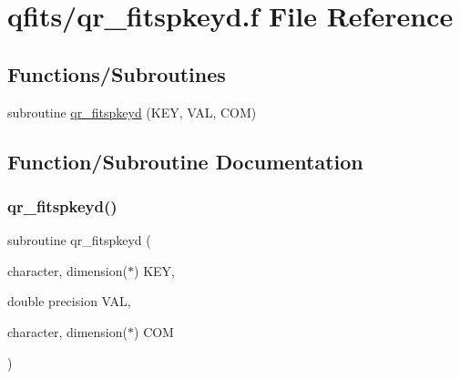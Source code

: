 \hypertarget{qr__fitspkeyd_8f}{}\section{qfits/qr\+\_\+fitspkeyd.f File Reference}
\label{qr__fitspkeyd_8f}
\subsection*{Functions/\+Subroutines}
\begin{DoxyCompactItemize}
\item 
subroutine \hyperlink{qr__fitspkeyd_8f_ac523cda00503719a0268a4125191151a}{qr\+\_\+fitspkeyd} (K\+EY, V\+AL, C\+OM)
\end{DoxyCompactItemize}


\subsection{Function/\+Subroutine Documentation}
\mbox{\label{qr__fitspkeyd_8f_ac523cda00503719a0268a4125191151a}} 
\subsubsection{\texorpdfstring{qr\+\_\+fitspkeyd()}{qr\_fitspkeyd()}}
{\footnotesize\ttfamily subroutine qr\+\_\+fitspkeyd (\begin{DoxyParamCaption}\item[{character, dimension($\ast$)}]{K\+EY,  }\item[{double precision}]{V\+AL,  }\item[{character, dimension($\ast$)}]{C\+OM }\end{DoxyParamCaption})}

